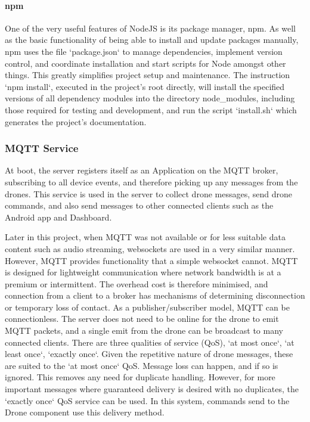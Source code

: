 \documentclass{article}
\begin{document}
\paragraph{npm}\label{npm}
One of the very useful features of NodeJS is its package manager, npm. As well as the basic functionality of being able to install and update packages manually, npm uses the file `package.json` to manage dependencies, implement version control, and coordinate installation and start scripts for Node amongst other things. This greatly simplifies project setup and maintenance. The instruction `npm install`, executed in the project's root directly, will install the specified versions of all dependency modules into the directory node\_modules, including those required for testing and development, and run the script `install.sh` which generates the project's documentation.   

\subsubsection{MQTT Service}
At boot, the server registers itself as an Application on the MQTT broker, subscribing to all device events, and therefore picking up any messages from the drones. This service is used in the server to collect drone messages, send drone commands, and also send messages to other connected clients such as the Android app and Dashboard.

Later in this project, when MQTT was not available or for less suitable data content such as audio streaming, websockets are used in a very similar manner. However, MQTT provides functionality that a simple websocket cannot. MQTT is designed for lightweight communication where network bandwidth is at a premium or intermittent\cite{mqttSpec}. The overhead cost is therefore minimised, and connection from a client to a broker has mechanisms of determining disconnection or temporary loss of contact. As a publisher/subscriber model, MQTT can be connectionless. The server does not need to be online for the drone to emit MQTT packets, and a single emit from the drone can be broadcast to many connected clients. There are three qualities of service (QoS), `at most once`, `at least once`, `exactly once`\cite{mqttSpec}. Given the repetitive nature of drone messages, these are suited to the `at most once` QoS. Message loss can happen, and if so is ignored. This removes any need for duplicate handling. However, for more important messages where guaranteed delivery is desired with no duplicates, the `exactly once` QoS service can be used. In this system, commands send to the Drone component use this delivery method.
\end{document}
